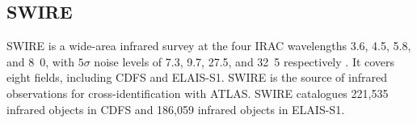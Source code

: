 \documentclass[fleqn,usenatbib,usedcolumn]{mnras}
\newcommand{\jansky}{\text{Jy}}
\begin{document}

  \subsection{SWIRE}\label{sec:swire}

    SWIRE \citep{lonsdale03swire, surace05swire} is a wide-area infrared survey
    at the four IRAC wavelengths 3.6, 4.5, 5.8, and
    \unit{8.0}{\micro\meter}, with $5\sigma$ noise levels of 7.3,
    9.7, 27.5, and \unit{32.5}{\micro\jansky} respectively
    \citep{lonsdale03swire}. It covers eight fields, including CDFS and ELAIS-S1. SWIRE is the source of infrared
    observations for cross-identification with ATLAS. SWIRE catalogues 221,535
    infrared objects in CDFS and 186,059 infrared objects in ELAIS-S1.
\end{document}
